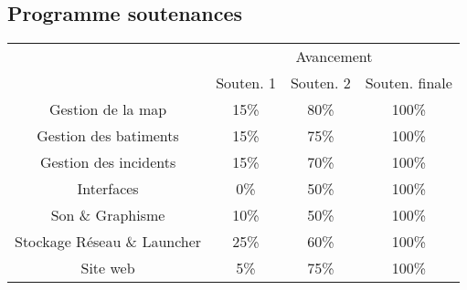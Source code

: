 \subsection{Programme soutenances}
\begin{table}[h]
\begin{tabular}{c|c|c|c|}
\cline{2-4}
                                                  & \multicolumn{3}{c|}{Avancement}        \\ \cline{2-4} 
                                                  & Souten. 1 & Souten. 2 & Souten. finale \\ \hline
\multicolumn{1}{|c|}{Gestion de la map}           & 15\%      & 80\%      & 100\%          \\ \hline
\multicolumn{1}{|c|}{Gestion des batiments}       & 15\%      & 75\%      & 100\%          \\ \hline
\multicolumn{1}{|c|}{Gestion des incidents}       & 15\%      & 70\%      & 100\%          \\ \hline
\multicolumn{1}{|c|}{Interfaces}                  & 0\%       & 50\%      & 100\%          \\ \hline
\multicolumn{1}{|c|}{Son \& Graphisme}            & 10\%      & 50\%      & 100\%          \\ \hline
\multicolumn{1}{|c|}{Stockage Réseau \& Launcher} & 25\%      & 60\%      & 100\%          \\ \hline
\multicolumn{1}{|c|}{Site web}                    & 5\%       & 75\%      & 100\%          \\ \hline
\end{tabular}
\end{table}